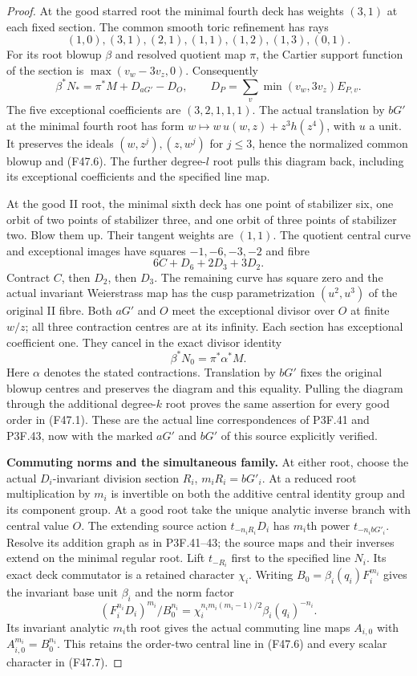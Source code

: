 \begin{proof}
At the good starred root the minimal fourth deck has weights
$(3,1)$ at each fixed section. The common smooth toric refinement
has rays
\[
 (1,0),(3,1),(2,1),(1,1),(1,2),(1,3),(0,1).
\]
For its root blowup $\beta$ and resolved quotient map $\pi$,
the Cartier support function of the section is
$\max(v_w-3v_z,0)$. Consequently
\[
 \beta^*N_* =\pi^*M+D_{aG'}-D_O,\qquad
 D_P=\sum_v\min(v_w,3v_z)E_{P,v}.                    \tag{F47.6}
\]
The five exceptional coefficients are $(3,2,1,1,1)$.
The actual translation by $bG'$ at the minimal fourth root
has form $w\mapsto w\,u(w,z)+z^3h(z^4)$, with $u$ a unit.
It preserves the ideals $(w,z^j),(z,w^j)$ for $j\leq3$,
hence the normalized common blowup and (F47.6).
The further degree-$l$ root pulls this diagram back, including
its exceptional coefficients and the specified line map.

At the good II root, the minimal sixth deck has one point of
stabilizer six, one orbit of two points of stabilizer three,
and one orbit of three points of stabilizer two. Blow them up.
Their tangent weights are $(1,1)$. The quotient central curve
and exceptional images have squares $-1,-6,-3,-2$ and fibre
\[
                          6C+D_6+2D_3+3D_2.
\]
Contract $C$, then $D_2$, then $D_3$. The remaining curve
has square zero and the actual invariant Weierstrass map has
the cusp parametrization $(u^2,u^3)$ of the original II fibre.
Both $aG'$ and $O$ meet the exceptional divisor over $O$ at
finite $w/z$; all three contraction centres are at its infinity.
Each section has exceptional coefficient one. They cancel in
the exact divisor identity
\[
                  \beta^*N_0=\pi^*\alpha^*M.           \tag{F47.7}
\]
Here $\alpha$ denotes the stated contractions. Translation by
$bG'$ fixes the original blowup centres and preserves the
diagram and this equality. Pulling the diagram through the
additional degree-$k$ root proves the same assertion for
every good order in (F47.1). These are the actual line
correspondences of P3F.41 and P3F.43, now with the marked
$aG'$ and $bG'$ of this source explicitly verified.

\par\medskip\noindent\textbf{Commuting norms and the simultaneous family.}\enspace
At either root, choose the actual $D_i$-invariant division
section $R_i$, $m_iR_i=bG'_i$. At a reduced root multiplication
by $m_i$ is invertible on both the additive central identity
group and its component group. At a good root take the unique
analytic inverse branch with central value $O$.
The extending source action $t_{-n_iR_i}D_i$ has $m_i$th
power $t_{-n_i bG'_i}$. Resolve its addition graph as in
P3F.41--43; the source maps and their inverses extend on the
minimal regular root.
Lift $t_{-R_i}$ first to the specified line $N_i$.
Its exact deck commutator is a retained character $\chi_i$.
Writing $B_0=\beta_i(q_i)F_i^{m_i}$ gives the invariant
base unit $\beta_i$ and the norm factor
\[
 (F_i^{n_i}D_i)^{m_i}/B_0^{n_i}
    =\chi_i^{n_im_i(m_i-1)/2}\beta_i(q_i)^{-n_i}.
\]
Its invariant analytic $m_i$th root gives the actual commuting
line maps $A_{i,0}$ with $A_{i,0}^{m_i}=B_0^{n_i}$.
This retains the order-two central line in (F47.6) and every
scalar character in (F47.7).


\end{proof}
